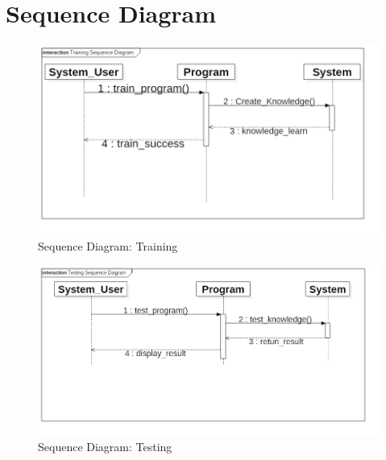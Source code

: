 \newpage
\section{Sequence Diagram}
\begin{figure}[H] %
\begin{center}
	\includegraphics[width = 6in]{images/TrainingSequence.png}
	\caption{Sequence Diagram: Training} %
	\label{Sequence} %
\end{center}
\end{figure}

\begin{figure}[H] %
\begin{center}
	\includegraphics[width = 6in]{images/TestingSequence.png}
	\caption{Sequence Diagram: Testing} %
	\label{Sequence} %
\end{center}
\end{figure}

